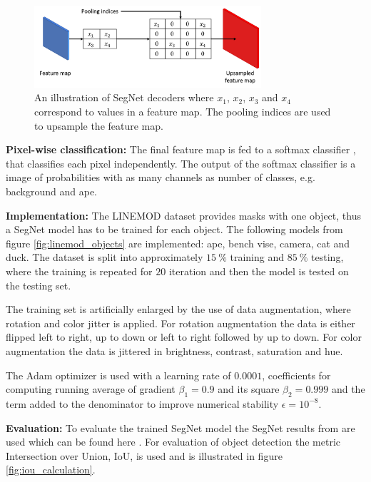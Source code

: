 \documentclass[../main.tex]{subfiles}
\begin{document}
\begin{figure}[H]
    \centering
    \includegraphics[width=0.75\textwidth]{figures/segmentation/segnet_upsampling_of_feat_map.png}
    \caption{An illustration of SegNet decoders where $x_1$, $x_2$, $x_3$ and $x_4$ correspond to values in a feature map. The pooling indices are used to upsample the feature map.}
    \label{fig:segnet_upsampling_feature_map}
\end{figure}


\textbf{Pixel-wise classification:} The final feature map is fed to a softmax classifier \cite{softmax}, that classifies each pixel independently. The output of the softmax classifier is a image of probabilities with as many channels as number of classes, e.g. background and ape.

\textbf{Implementation:} The LINEMOD dataset provides masks with one object, thus a SegNet model has to be trained for each object. The following models from figure \ref{fig:linemod_objects} are implemented: ape, bench vise, camera, cat and duck. The dataset is split into approximately $15\ \%$ training and $85\ \%$ testing, where the training is repeated for $20$ iteration and then the model is tested on the testing set.

The training set is artificially enlarged by the use of data augmentation, where rotation and color jitter is applied. For rotation augmentation the data is either flipped left to right, up to down or left to right followed by up to down. For color augmentation the data is jittered in brightness, contrast, saturation and hue.

The Adam optimizer \cite{adam} is used with a learning rate of $0.0001$, coefficients for computing running average of gradient $\beta_1 = 0.9$ and its square $\beta_2 = 0.999$ and the term added to the denominator to improve numerical stability $\epsilon = 10^{-8}$.

\textbf{Evaluation:} To evaluate the trained SegNet model the SegNet results from \cite{posecnn} are used which can be found here \cite{linemod_preprocessed}. For evaluation of object detection the metric Intersection over Union, IoU, is used and is illustrated in figure \ref{fig:iou_calculation}.
\end{document}
